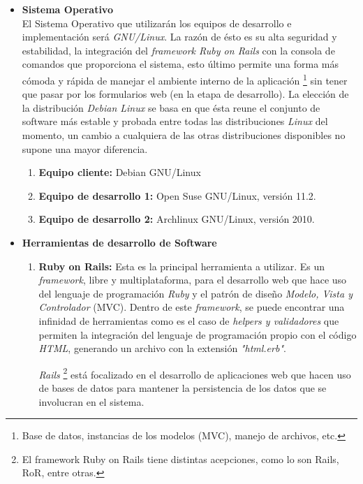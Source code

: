\documentclass[letterpaper,12pt]{article}
\begin{document}
\begin{itemize}
\item \textbf{Sistema Operativo} \\
El Sistema Operativo que utilizarán los equipos de desarrollo e implementación será \emph{GNU/Linux}. 
La razón de ésto es su alta seguridad y estabilidad, la integración del \emph{framework Ruby on Rails} 
con la consola de comandos que proporciona el sistema, esto último permite una forma más cómoda y rápida 
de manejar el ambiente interno de la aplicación \footnote{Base de datos, instancias de los modelos (MVC), manejo de archivos, etc.}
sin tener que pasar por los formularios web (en la etapa de desarrollo). La elección de la distribución \emph{Debian Linux} se basa en 
que ésta reune el conjunto de software más estable y probada entre todas las distribuciones \emph{Linux} del momento, un 
cambio a cualquiera de las otras distribuciones disponibles no supone una mayor diferencia.

\begin{enumerate}
\item \textbf{Equipo cliente:}
Debian GNU/Linux 
\item \textbf{Equipo de desarrollo 1:}
Open Suse GNU/Linux, versión 11.2.
\item \textbf{Equipo de desarrollo 2:}
Archlinux GNU/Linux, versión 2010.
\end{enumerate}

\newpage

\item \textbf{Herramientas de desarrollo de Software}

\begin{enumerate}
\item \textbf{Ruby on Rails:}
Esta es la principal herramienta a utilizar. Es un \emph{framework}, libre y multiplataforma, para el desarrollo web que
hace uso del lenguaje de programación \emph{Ruby} y el patrón de diseño \emph{Modelo, Vista y
Controlador} (MVC). Dentro de este \emph{framework}, se puede encontrar una infinidad de herramientas 
como es el caso de \emph{helpers y validadores} que permiten la integración del lenguaje de programación 
propio con el código \emph{HTML}, generando un archivo con la extensión \emph{"html.erb"}. 

\emph{Rails} \footnote{El framework Ruby on Rails tiene distintas acepciones, como lo son Rails, RoR, entre otras.} 
está focalizado en el desarrollo de aplicaciones web que hacen uso de bases de datos para mantener la persistencia 
de los datos que se involucran en el sistema.


\end{enumerate}
\end{itemize}
\end{document}
